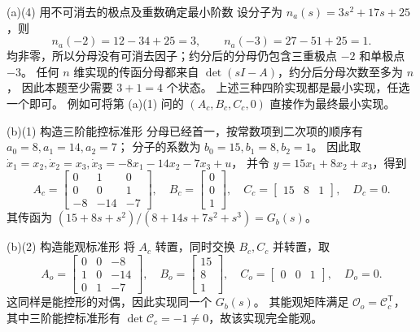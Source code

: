 \documentclass[11pt]{article}
\begin{document}
\begin{solution}
\begin{proofstep}{(a)(4) 用不可消去的极点及重数确定最小阶数}
设分子为 $n_a(s)=3s^2+17s+25$，则
\[
n_a(-2)=12-34+25=3,\qquad n_a(-3)=27-51+25=1.
\]
均非零，所以分母没有可消去因子；约分后的分母仍包含三重极点 $-2$ 和单极点 $-3$。
任何 $n$ 维实现的传函分母都来自 $\det(sI-A)$，约分后分母次数至多为 $n$，
因此本题至少需要 $3+1=4$ 个状态。
上述三种四阶实现都是最小实现，任选一个即可。
例如可将第 (a)(1) 问的 $(A_c,B_c,C_c,0)$ 直接作为最终最小实现。
\end{proofstep}

\pagebreak
\begin{proofstep}{(b)(1) 构造三阶能控标准形}
分母已经首一，按常数项到二次项的顺序有 $a_0=8,a_1=14,a_2=7$；
分子的系数为 $b_0=15,b_1=8,b_2=1$。
因此取 $\dot x_1=x_2,\dot x_2=x_3,\dot x_3=-8x_1-14x_2-7x_3+u$，
并令 $y=15x_1+8x_2+x_3$，得到
\[
A_c=\begin{bmatrix}0&1&0\\0&0&1\\-8&-14&-7\end{bmatrix},\quad
B_c=\begin{bmatrix}0\\0\\1\end{bmatrix},\quad
C_c=\begin{bmatrix}15&8&1\end{bmatrix},\quad D_c=0.
\]
其传函为 $(15+8s+s^2)/(8+14s+7s^2+s^3)=G_b(s)$。
\end{proofstep}

\begin{proofstep}{(b)(2) 构造能观标准形}
将 $A_c$ 转置，同时交换 $B_c,C_c$ 并转置，取
\[
A_o=\begin{bmatrix}0&0&-8\\1&0&-14\\0&1&-7\end{bmatrix},\quad
B_o=\begin{bmatrix}15\\8\\1\end{bmatrix},\quad
C_o=\begin{bmatrix}0&0&1\end{bmatrix},\quad D_o=0.
\]
这同样是能控形的对偶，因此实现同一个 $G_b(s)$。
其能观矩阵满足 $\mathcal O_o=\mathcal C_c^{\mathsf T}$，
其中三阶能控标准形有 $\det\mathcal C_c=-1\ne0$，故该实现完全能观。
\end{proofstep}


\end{solution}
\end{document}
